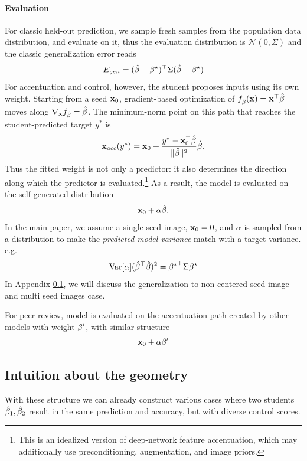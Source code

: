 \documentclass{article}
\theoremstyle{plain}
\theoremstyle{definition}
\begin{document}
\paragraph{Evaluation}
For classic held-out prediction, we sample fresh samples from the population data distribution, and evaluate on it, thus the evaluation distribution is $\mathcal{N}(0,\Sigma)$ and the classic generalization error reads %
\begin{equation}
    E_{gen}=(\hat{\beta}-{\beta^{\star}})^\top\Sigma(\hat{\beta}-{\beta^{\star}})
\end{equation}
For accentuation and control, however, the student proposes inputs using its own weight.
Starting from a seed $\mathbf{x}_0$, gradient-based optimization of $f_{\hat{\beta}}(\mathbf{x})=\mathbf{x}^\top\hat{\beta}$ moves along $\nabla_{\mathbf{x}}f_{\hat{\beta}}=\hat{\beta}$.
The minimum-norm point on this path that reaches the student-predicted target $y^*$ is
\begin{equation}
    \mathbf{x}_{acc}(y^*)
    =\mathbf{x}_0+\frac{y^*-\mathbf{x}_0^\top\hat{\beta}}{\|\hat{\beta}\|^2}\hat{\beta}.
    \label{eq:linear-accentuation-path}
\end{equation}
Thus the fitted weight is not only a predictor: it also determines the direction along which the predictor is evaluated.\footnote{This is an idealized version of deep-network feature accentuation, which may additionally use preconditioning, augmentation, and image priors.}
As a result, the model is evaluated on the self-generated distribution
\[
\mathbf{x}_{0}+\alpha\hat{\beta}.
\]
In the main paper, we assume a single seed image, $\mathbf{x}_{0}=0$,
and $\alpha$ is sampled from a distribution to make the \emph{predicted
model variance} match with a target variance. e.g.
\[
\mathrm{Var}[\alpha]({\hat{\beta}}^{\top}\hat{\beta})^2={{\beta^{\star}}}^{\top}\Sigma{\beta^{\star}}
\]
In Appendix \ref{}, we will discuss the generalization to non-centered seed image and multi seed images case.

For peer review, model is evaluated on the accentuation path created
by other models with weight ${\beta^{\prime}}$, with similar structure
\[
\mathbf{x}_{0}+\alpha{\beta^{\prime}}
\]


\subsection{Intuition about the geometry}

With these structure we can already construct various cases where
two students $\hat{\beta}_{1},\hat{\beta}_{2}$ result in the same
prediction and accuracy, but with diverse control scores.
\end{document}
